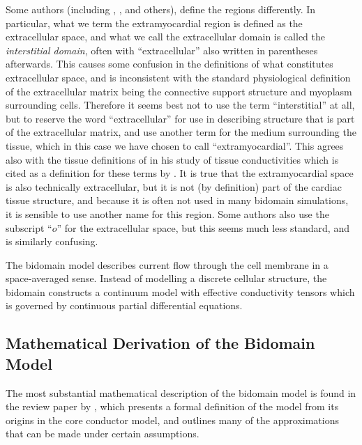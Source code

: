 Some authors (including ,
,  and others), define the
regions differently.  In particular, what we term the extramyocardial region
is defined as the extracellular space, and what we call the extracellular
domain is called the \emph{interstitial domain}, often with ``extracellular''
also written in parentheses afterwards.  This causes some confusion in the
definitions of what constitutes extracellular space, and is inconsistent with
the standard physiological definition of the extracellular matrix being the
connective support structure and myoplasm surrounding cells.  Therefore it
seems best not to use the term ``interstitial'' at all, but to reserve the
word ``extracellular'' for use in describing structure that is part of the
extracellular matrix, and use another term for the medium surrounding the
tissue, which in this case we have chosen to call ``extramyocardial''.  This
agrees also with the tissue definitions of  in his
study of tissue conductivities which is cited as a definition for these terms
by .  It is true that the extramyocardial
space is also technically extracellular, but it is not (by definition) part of
the cardiac tissue structure, and because it is often not used in many
bidomain simulations, it is sensible to use another name for this region.
Some authors\cite{plonsey:1987} also use the subscript ``$o$'' for the
extracellular space, but this seems much less standard, and is similarly
confusing.

The bidomain model describes current flow through the cell membrane in a
space-averaged sense.  Instead of modelling a discrete cellular structure, the
bidomain constructs a continuum model with effective conductivity tensors
which is governed by continuous partial differential equations.  

\subsection{Mathematical Derivation of the Bidomain Model}

The most substantial mathematical description of the bidomain model is found
in the review paper by , which presents a formal
definition of the model from its origins in the core conductor model, and
outlines many of the approximations that can be made under certain
assumptions.

